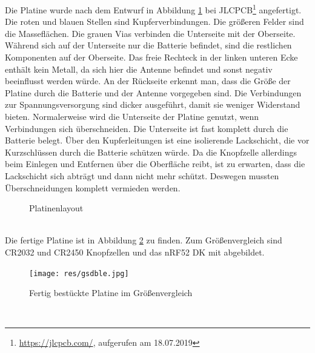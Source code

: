 Die Platine wurde nach dem Entwurf in Abbildung \ref{fig:platinenlayout} bei JLCPCB\footnote{\url{https://jlcpcb.com/}, aufgerufen am 18.07.2019} angefertigt.
Die roten und blauen Stellen sind Kupferverbindungen.
Die größeren Felder sind die Masseflächen.
Die grauen Vias verbinden die Unterseite mit der Oberseite.
Während sich auf der Unterseite nur die Batterie befindet, sind die restlichen Komponenten auf der Oberseite.
Das freie Rechteck in der linken unteren Ecke enthält kein Metall, da sich hier die Antenne befindet und sonst negativ beeinflusst werden würde.
An der Rückseite erkennt man, dass die Größe der Platine durch die Batterie und der Antenne vorgegeben sind.
Die Verbindungen zur Spannungsversorgung sind dicker ausgeführt, damit sie weniger Widerstand bieten.
Normalerweise wird die Unterseite der Platine genutzt, wenn Verbindungen sich überschneiden.
Die Unterseite ist fast komplett durch die Batterie belegt.
Über den Kupferleitungen ist eine isolierende Lackschicht, die vor Kurzschlüssen durch die Batterie schützen würde.
Da die Knopfzelle allerdings beim Einlegen und Entfernen über die Oberfläche reibt, ist zu erwarten, dass die Lackschicht sich abträgt und dann nicht mehr schützt.
Deswegen mussten Überschneidungen komplett vermieden werden.
\begin{figure}[hbtp]
	\centering
	\caption{Platinenlayout}
	\label{fig:platinenlayout}
\end{figure}\\
Die fertige Platine ist in Abbildung \ref{fig:platine} zu finden.
Zum Größenvergleich sind CR2032 und CR2450 Knopfzellen und das nRF52 DK mit abgebildet.
\begin{figure}[hbtp]
	\centering
	\texttt{[image: res/gsdble.jpg]}
	\caption{Fertig bestückte Platine im Größenvergleich}
	\label{fig:platine}
\end{figure}\\

